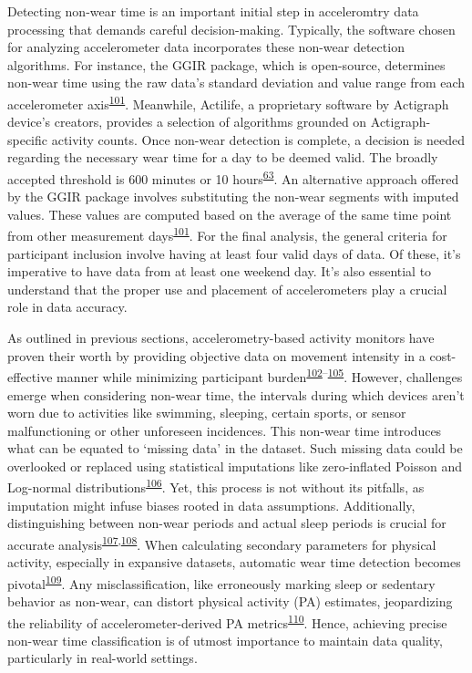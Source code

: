 \documentclass[
  10pt,
]{scrbook}
\begin{document}
Detecting non-wear time is an important initial step in acceleromtry
data processing that demands careful decision-making. Typically, the
software chosen for analyzing accelerometer data incorporates these
non-wear detection algorithms. For instance, the GGIR package, which is
open-source, determines non-wear time using the raw data's standard
deviation and value range from each accelerometer
axis\textsuperscript{\protect\hyperlink{ref-migueles_ggir_2019}{101}}.
Meanwhile, Actilife, a proprietary software by Actigraph device's
creators, provides a selection of algorithms grounded on
Actigraph-specific activity counts. Once non-wear detection is complete,
a decision is needed regarding the necessary wear time for a day to be
deemed valid. The broadly accepted threshold is 600 minutes or 10
hours\textsuperscript{\protect\hyperlink{ref-migueles_accelerometer_2017}{63}}.
An alternative approach offered by the GGIR package involves
substituting the non-wear segments with imputed values. These values are
computed based on the average of the same time point from other
measurement
days\textsuperscript{\protect\hyperlink{ref-migueles_ggir_2019}{101}}.
For the final analysis, the general criteria for participant inclusion
involve having at least four valid days of data. Of these, it's
imperative to have data from at least one weekend day. It's also
essential to understand that the proper use and placement of
accelerometers play a crucial role in data accuracy.

As outlined in previous sections, accelerometry-based activity monitors
have proven their worth by providing objective data on movement
intensity in a cost-effective manner while minimizing participant
burden\textsuperscript{\protect\hyperlink{ref-dowd_systematic_2018}{102}--\protect\hyperlink{ref-migueles_comparability_2019}{105}}.
However, challenges emerge when considering non-wear time, the intervals
during which devices aren't worn due to activities like swimming,
sleeping, certain sports, or sensor malfunctioning or other unforeseen
incidences. This non-wear time introduces what can be equated to
`missing data' in the dataset. Such missing data could be overlooked or
replaced using statistical imputations like zero-inflated Poisson and
Log-normal
distributions\textsuperscript{\protect\hyperlink{ref-lee_missing_2018}{106}}.
Yet, this process is not without its pitfalls, as imputation might
infuse biases rooted in data assumptions. Additionally, distinguishing
between non-wear periods and actual sleep periods is crucial for
accurate
analysis\textsuperscript{\protect\hyperlink{ref-choi_validation_2011}{107},\protect\hyperlink{ref-winkler_identifying_2016}{108}}.
When calculating secondary parameters for physical activity, especially
in expansive datasets, automatic wear time detection becomes
pivotal\textsuperscript{\protect\hyperlink{ref-matthews_2002}{109}}. Any
misclassification, like erroneously marking sleep or sedentary behavior
as non-wear, can distort physical activity (PA) estimates, jeopardizing
the reliability of accelerometer-derived PA
metrics\textsuperscript{\protect\hyperlink{ref-king_2011}{110}}. Hence,
achieving precise non-wear time classification is of utmost importance
to maintain data quality, particularly in real-world settings.
\end{document}
